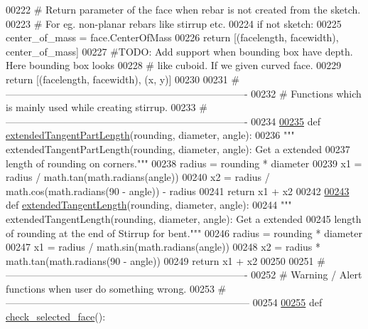 \begin{DoxyCode}
00222     \textcolor{comment}{# Return parameter of the face when rebar is not created from the sketch.}
00223     \textcolor{comment}{# For eg. non-planar rebars like stirrup etc.}
00224     \textcolor{keywordflow}{if} \textcolor{keywordflow}{not} sketch:
00225         center\_of\_mass = face.CenterOfMass
00226         \textcolor{keywordflow}{return} [(facelength, facewidth), center\_of\_mass]
00227     \textcolor{comment}{#TODO: Add support when bounding box have depth. Here bounding box looks}
00228     \textcolor{comment}{# like cuboid. If we given curved face.}
00229     \textcolor{keywordflow}{return} [(facelength, facewidth), (x, y)]
00230 
00231 \textcolor{comment}{# -------------------------------------------------------------------------}
00232 \textcolor{comment}{# Functions which is mainly used while creating stirrup.}
00233 \textcolor{comment}{# -------------------------------------------------------------------------}
00234 
\hypertarget{Rebarfunc_8py_source.tex_l00235}{}\hyperlink{namespaceRebarfunc_aaeecb468e0fcfc5eee69d6a24c5c5aef}{00235} \textcolor{keyword}{def }\hyperlink{namespaceRebarfunc_aaeecb468e0fcfc5eee69d6a24c5c5aef}{extendedTangentPartLength}(rounding, diameter, angle):
00236     \textcolor{stringliteral}{""" extendedTangentPartLength(rounding, diameter, angle): Get a extended}
00237 \textcolor{stringliteral}{    length of rounding on corners."""}
00238     radius = rounding * diameter
00239     x1 = radius / math.tan(math.radians(angle))
00240     x2 = radius / math.cos(math.radians(90 - angle)) - radius
00241     \textcolor{keywordflow}{return} x1 + x2
00242 
\hypertarget{Rebarfunc_8py_source.tex_l00243}{}\hyperlink{namespaceRebarfunc_ab5637ab0a8e202409ee8657d39ca87a0}{00243} \textcolor{keyword}{def }\hyperlink{namespaceRebarfunc_ab5637ab0a8e202409ee8657d39ca87a0}{extendedTangentLength}(rounding, diameter, angle):
00244     \textcolor{stringliteral}{""" extendedTangentLength(rounding, diameter, angle): Get a extended}
00245 \textcolor{stringliteral}{    length of rounding at the end of Stirrup for bent."""}
00246     radius = rounding * diameter
00247     x1 = radius / math.sin(math.radians(angle))
00248     x2 = radius * math.tan(math.radians(90 - angle))
00249     \textcolor{keywordflow}{return} x1 + x2
00250 
00251 \textcolor{comment}{# -------------------------------------------------------------------------}
00252 \textcolor{comment}{# Warning / Alert functions when user do something wrong.}
00253 \textcolor{comment}{#--------------------------------------------------------------------------}
00254 
\hypertarget{Rebarfunc_8py_source.tex_l00255}{}\hyperlink{namespaceRebarfunc_adae2713855a7e1b4bda04081ae671542}{00255} \textcolor{keyword}{def }\hyperlink{namespaceRebarfunc_adae2713855a7e1b4bda04081ae671542}{check\_selected\_face}():

\end{DoxyCode}
